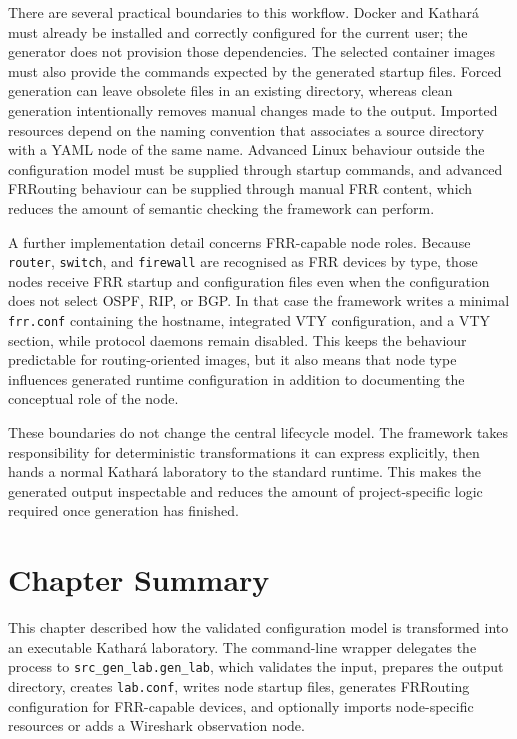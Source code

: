 There are several practical boundaries to this workflow. Docker and Kathar\'a
must already be installed and correctly configured for the current user; the
generator does not provision those dependencies. The selected container images
must also provide the commands expected by the generated startup files. Forced
generation can leave obsolete files in an existing directory, whereas clean
generation intentionally removes manual changes made to the output. Imported
resources depend on the naming convention that associates a source directory
with a YAML node of the same name. Advanced Linux behaviour outside the
configuration model must be supplied through startup commands, and advanced
FRRouting behaviour can be supplied through manual FRR content, which reduces
the amount of semantic checking the framework can perform.

A further implementation detail concerns FRR-capable node roles. Because
\texttt{router}, \texttt{switch}, and \texttt{firewall} are recognised as FRR
devices by type, those nodes receive FRR startup and configuration files even
when the configuration does not select OSPF, RIP, or BGP. In that case the
framework writes a minimal \texttt{frr.conf} containing the hostname,
integrated VTY configuration, and a VTY section, while protocol daemons remain
disabled. This keeps the behaviour predictable for routing-oriented images,
but it also means that node type influences generated runtime configuration in
addition to documenting the conceptual role of the node.

These boundaries do not change the central lifecycle model. The framework takes
responsibility for deterministic transformations it can express explicitly,
then hands a normal Kathar\'a laboratory to the standard runtime. This makes the
generated output inspectable and reduces the amount of project-specific logic
required once generation has finished.

\section{Chapter Summary}
\label{sec:laboratory-generation-summary}

This chapter described how the validated configuration model is transformed
into an executable Kathar\'a laboratory. The command-line wrapper delegates the
process to \texttt{src\_gen\_lab.gen\_lab}, which validates the input, prepares
the output directory, creates \texttt{lab.conf}, writes node startup files,
generates FRRouting configuration for FRR-capable devices, and optionally
imports node-specific resources or adds a Wireshark observation node.

